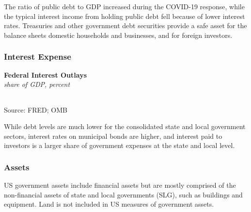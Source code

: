 \documentclass{report}
\makeatletter
\newcommand{\tbllink}[1]{\href{https://raw.githubusercontent.com/bdecon/US-chartbook/master/chartbook/data/#1}{\faTable}}
\newcommand*\short[1]{\expandafter\@gobbletwo\number\numexpr#1\relax}
\newcommand{\shdateaxisticks}{
		date coordinates in=x, axis line style={draw=none},
		xmax={2021-05-15},
		max space between ticks=40,	    
		xtick={{1990-01-01}, {1995-01-01}, {2000-01-01}, 
			{2005-01-01}, {2010-01-01}, {2015-01-01}, {2020-01-01}},
		minor xtick={},
		enlarge y limits={0.06}, enlarge x limits={0.01},
		}
\newcommand{\thickline}[4]{\addplot[ultra thick, no markers, color=#1] 
		table [x=#2, y=#3, col sep=comma] {#4};	}
\newcommand{\rbars}{
		\fill[color=black!10] (axis cs:{1990-07-01},\pgfkeysvalueof{/pgfplots/ymin}) rectangle 
			(axis cs:{1991-03-01}, \pgfkeysvalueof{/pgfplots/ymax});
		\fill[color=black!10] (axis cs:{2007-12-01},\pgfkeysvalueof{/pgfplots/ymin}) rectangle 
			(axis cs:{2009-07-01}, \pgfkeysvalueof{/pgfplots/ymax});
		\fill[color=black!10] (axis cs:{2001-03-01},\pgfkeysvalueof{/pgfplots/ymin}) rectangle 
			(axis cs:{2001-11-01}, \pgfkeysvalueof{/pgfplots/ymax});
		\fill[color=black!10] (axis cs:{2020-02-01},\pgfkeysvalueof{/pgfplots/ymin}) rectangle 
			(axis cs:{2021-05-15}, \pgfkeysvalueof{/pgfplots/ymax});}
\makeatother
\begin{document}
{\begin{minipage}{0.76\textwidth}
\small The ratio of public debt to GDP increased during the COVID-19 response, while the typical interest income from holding public debt fell because of lower interest rates. Treasuries and other government debt securities provide a safe asset for the balance sheets domestic households and businesses, and for foreign investors.
\end{minipage}
\subsubsection*{\color{black!70} \seriffont Interest Expense}
\begin{minipage}{0.33\textwidth}
\small 
\end{minipage} \hspace{6mm} \begin{minipage}{0.38\textwidth}
\normalsize \textbf{Federal Interest Outlays}\\
\footnotesize{\textit{share of GDP, percent}}\\
\hspace*{-2mm} \\
\footnotesize{Source: FRED; OMB} \hfill \tbllink{fedintexp.csv}
\end{minipage} 
\vspace{1mm}

\begin{minipage}{0.76\textwidth}
\small While debt levels are much lower for the consolidated state and local government sectors, interest rates on municipal bonds are higher, and interest paid to investors is a larger share of government expenses at the state and local level.
\end{minipage}
\newpage
\begin{minipage}{0.76\textwidth}
\subsubsection*{\color{black!70} \seriffont Assets}
\small US government assets include financial assets but are mostly comprised of the non-financial assets of state and local governments (SLG), such as buildings and equipment. Land is not included in US measures of government assets. 


\end{minipage}}
\end{document}
